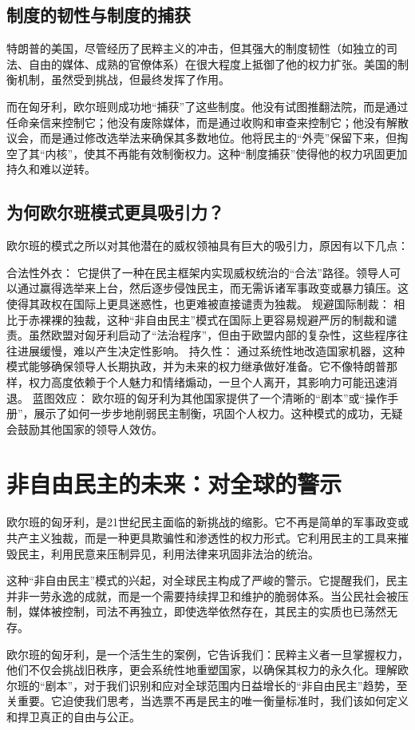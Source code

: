 \subsection{制度的韧性与制度的捕获}

特朗普的美国，尽管经历了民粹主义的冲击，但其强大的制度韧性（如独立的司法、自由的媒体、成熟的官僚体系）在很大程度上抵御了他的权力扩张。美国的制衡机制，虽然受到挑战，但最终发挥了作用。

而在匈牙利，欧尔班则成功地“捕获”了这些制度。他没有试图推翻法院，而是通过任命亲信来控制它；他没有废除媒体，而是通过收购和审查来控制它；他没有解散议会，而是通过修改选举法来确保其多数地位。他将民主的“外壳”保留下来，但掏空了其“内核”，使其不再能有效制衡权力。这种“制度捕获”使得他的权力巩固更加持久和难以逆转。

\subsection{为何欧尔班模式更具吸引力？}

欧尔班的模式之所以对其他潜在的威权领袖具有巨大的吸引力，原因有以下几点：

合法性外衣： 它提供了一种在民主框架内实现威权统治的“合法”路径。领导人可以通过赢得选举来上台，然后逐步侵蚀民主，而无需诉诸军事政变或暴力镇压。这使得其政权在国际上更具迷惑性，也更难被直接谴责为独裁。
规避国际制裁： 相比于赤裸裸的独裁，这种“非自由民主”模式在国际上更容易规避严厉的制裁和谴责。虽然欧盟对匈牙利启动了“法治程序”，但由于欧盟内部的复杂性，这些程序往往进展缓慢，难以产生决定性影响。
持久性： 通过系统性地改造国家机器，这种模式能够确保领导人长期执政，并为未来的权力继承做好准备。它不像特朗普那样，权力高度依赖于个人魅力和情绪煽动，一旦个人离开，其影响力可能迅速消退。
蓝图效应： 欧尔班的匈牙利为其他国家提供了一个清晰的“剧本”或“操作手册”，展示了如何一步步地削弱民主制衡，巩固个人权力。这种模式的成功，无疑会鼓励其他国家的领导人效仿。

\section{非自由民主的未来：对全球的警示}

欧尔班的匈牙利，是21世纪民主面临的新挑战的缩影。它不再是简单的军事政变或共产主义独裁，而是一种更具欺骗性和渗透性的权力形式。它利用民主的工具来摧毁民主，利用民意来压制异见，利用法律来巩固非法治的统治。

这种“非自由民主”模式的兴起，对全球民主构成了严峻的警示。它提醒我们，民主并非一劳永逸的成就，而是一个需要持续捍卫和维护的脆弱体系。当公民社会被压制，媒体被控制，司法不再独立，即使选举依然存在，其民主的实质也已荡然无存。

欧尔班的匈牙利，是一个活生生的案例，它告诉我们：民粹主义者一旦掌握权力，他们不仅会挑战旧秩序，更会系统性地重塑国家，以确保其权力的永久化。理解欧尔班的“剧本”，对于我们识别和应对全球范围内日益增长的“非自由民主”趋势，至关重要。它迫使我们思考，当选票不再是民主的唯一衡量标准时，我们该如何定义和捍卫真正的自由与公正。